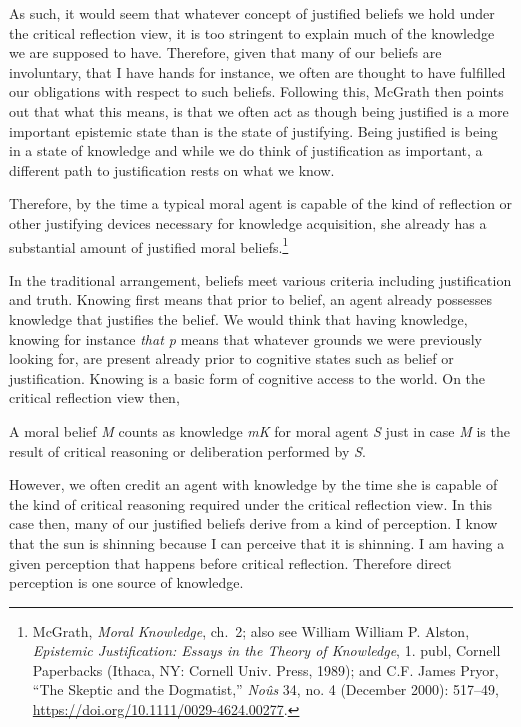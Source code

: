 \documentclass[phdthesis,12pt,final]{wuthesis}
\theoremstyle{definition}
\theoremstyle{definition}
\theoremstyle{definition}
\theoremstyle{definition}
\theoremstyle{remark}
\begin{document}
As such, it would seem that whatever concept of justified beliefs we hold under the critical reflection view, it is too stringent to explain much of the knowledge we are supposed to have. Therefore, given that many of our beliefs are involuntary, that I have hands for instance, we often are thought to have fulfilled our obligations with respect to such beliefs. Following this, McGrath then points out that what this means, is that we often act as though being justified is a more important epistemic state than is the state of justifying. Being justified is being in a state of knowledge and while we do think of justification as important, a different path to justification rests on what we know.

Therefore, by the time a typical moral agent is capable of the kind of reflection or other justifying devices necessary for knowledge acquisition, she already has a substantial amount of justified moral beliefs.\footnote{McGrath, \emph{Moral {Knowledge}}, ch.~2; also see William William P. Alston, \emph{Epistemic Justification: Essays in the Theory of Knowledge}, 1. publ, Cornell Paperbacks (Ithaca, NY: Cornell Univ. Press, 1989); and C.F. James Pryor, {``The {Skeptic} and the {Dogmatist},''} \emph{Noûs} 34, no. 4 (December 2000): 517--49, \url{https://doi.org/10.1111/0029-4624.00277}.}

In the traditional arrangement, beliefs meet various criteria including justification and truth. Knowing first means that prior to belief, an agent already possesses knowledge that justifies the belief. We would think that having knowledge, knowing for instance \emph{that p} means that whatever grounds we were previously looking for, are present already prior to cognitive states such as belief or justification. Knowing is a basic form of cognitive access to the world. On the critical reflection view then,

A moral belief \emph{M} counts as knowledge \emph{mK} for moral agent \emph{S} just in case \emph{M} is the result of critical reasoning or deliberation performed by \emph{S}.

However, we often credit an agent with knowledge by the time she is capable of the kind of critical reasoning required under the critical reflection view. In this case then, many of our justified beliefs derive from a kind of perception. I know that the sun is shinning because I can perceive that it is shinning. I am having a given perception that happens before critical reflection. Therefore direct perception is one source of knowledge.
\end{document}
